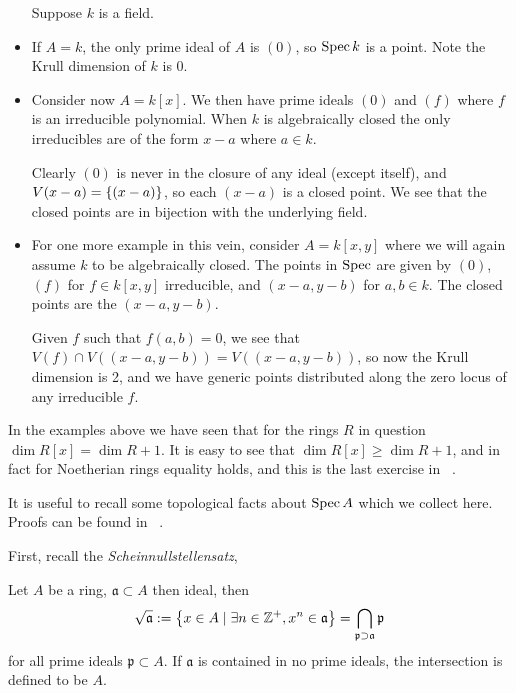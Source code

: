 \documentclass[000-main.tex]{subfiles}
\begin{document}
\begin{example}
  \begin{itemize}
    Suppose $k$ is a field.
    \item If $A = k$, the only prime ideal of $A$ is $(0)$, so $\operatorname{Spec} k$ is a point.
    Note the Krull dimension of $k$ is 0.

    \item Consider now $A = k[x]$.
    We then have prime ideals $(0)$ and $(f)$ where $f$ is an irreducible polynomial.
    When $k$ is algebraically closed the only irreducibles are of the form $x-a$ where $a \in k$.

    Clearly $(0)$ is never in the closure of any ideal (except itself), and $V(x-a) = \qty{(x-a)}$, so each $(x-a)$ is a closed point. %
    We see that the closed points are in bijection with the underlying field.

    \item For one more example in this vein, consider $A = k[x, y]$ where we will again assume $k$ to be algebraically closed.
    The points in $\operatorname{Spec}$ are given by $(0)$, $(f)$ for $f \in k[x, y]$ irreducible, and $(x-a, y-b)$ for $a,b \in k$.
    The closed points are the $(x-a, y-b)$.

    Given $f$ such that $f(a,b)=0$, we see that $V(f) \cap V((x-a, y-b)) = V((x-a, y-b))$, so now the Krull dimension is 2, and we have generic points distributed along the zero locus of any irreducible $f$.
  \end{itemize}
\end{example}

\begin{remark}
  In the examples above we have seen that for the rings $R$ in question $\dim R[x] = \dim R + 1$.
  It is easy to see that $\dim R[x] \geq \dim R + 1$, and in fact for Noetherian rings equality holds, and this is the last exercise in \citeauthor{atiyahIntroductionCommutativeAlgebra2000}~\cite{atiyahIntroductionCommutativeAlgebra2000}.
\end{remark}

It is useful to recall some topological facts about $\operatorname{Spec} A$ which we collect here.
Proofs can be found in \citeauthor{altmanTermCommutativeAlgebra2013}~\cite[][§13]{altmanTermCommutativeAlgebra2013}.

First, recall the \emph{Scheinnullstellensatz},
\begin{theorem}
  Let $A$ be a ring, $\mathfrak{a}\subset A$ then ideal, then
  \begin{displaymath}
    \sqrt{\mathfrak{a}} := \left\{ x\in A \mid \exists n\in\mathbb{Z}^+, x^n\in \mathfrak{a} \right\} = \bigcap_{\mathfrak{p}\supset\mathfrak{a}}\mathfrak{p}
  \end{displaymath}
  for all prime ideals $\mathfrak{p}\subset A$.
  If $\mathfrak{a}$ is contained in no prime ideals, the intersection is defined to be $A$.
\end{theorem}
\end{document}
